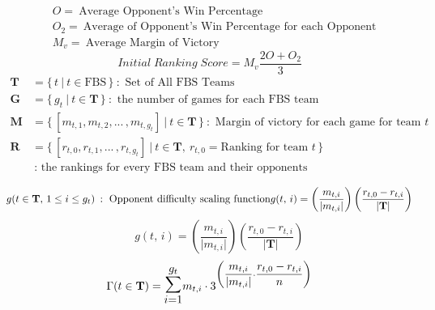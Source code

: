 \documentclass[onecolumn,fleqn,leqno]{minimal}
\begin{document}
	\fontsize{14}{13.5}\selectfont
	\begin{align*}
		&O =\: \text{Average Opponent's Win Percentage}\\
		&O_2 =\: \text{Average of Opponent's Win Percentage for each Opponent}\\
		&M_v =\: \text{Average Margin of Victory}
	\end{align*}
	\begin{equation}
		Initial\;Ranking\;Score=M_v\frac{2O+O_2}{3}
	\end{equation}
	\begin{align*}
		\mathbf{T} &= \{\,t \:|\: t \in \text{FBS}\,\}\::
			\text{ Set of All FBS Teams}\\
		\mathbf{G} &= \{\, g_t \:|\: t \in \mathbf{T}\,\}\::
			\text{ the number of games for each FBS team }\\
		\mathbf{M} &= \{\, [m_{t,1},m_{t,2},...\,,m_{t,g_t}] \:|\: t \in \mathbf{T} \,\}\::
			\text{ Margin of victory for each game for team } t\\
		\mathbf{R} &= \{\, [r_{t,0},r_{t,1},...\,,r_{t,g_t}] \:|\: 
			t \in \mathbf{T},\: r_{t,0}=\text{Ranking for team }t \,\}\\
			&\::\text{ the rankings for every FBS team and their opponents}\\
	\end{align*}
	\begin{equation}
		g(t \in \mathbf{T},\, 1 \leq i \leq g_t) \:: 
			\text{ Opponent difficulty scaling function} \\
		g(t,\,i)= \left(\frac{m_{t,i}}{\lvert m_{t,i}\rvert}\right)
			\left(\frac{r_{t,0}-r_{t,i}}
			{\lvert\mathbf{T}\rvert}\right)
	\end{equation}
	\begin{equation*}
		\;\;\;\;\;\;g(t,\,i)= \left(\frac{m_{t,i}}{\lvert m_{t,i}\rvert}\right)
				  \left(\frac{r_{t,0}-r_{t,i}}{\lvert\mathbf{T}\rvert}\right)
	\end{equation*} \vspace{5mm}
	\begin{equation}
		\Gamma(t \in \mathbf{T})=
		\mathlarger{\mathlarger{\mathlarger{\sum}}_{i=1}^{g_t}}
		m_{t,i}\cdot
		3^{
			\biggl(\dfrac{m_{t,i}}{\lvert m_{t,i}\rvert}
			\cdot\dfrac{r_{t,0}-r_{t,i}}{n}\biggr)
		}
	\end{equation}
\end{document}
